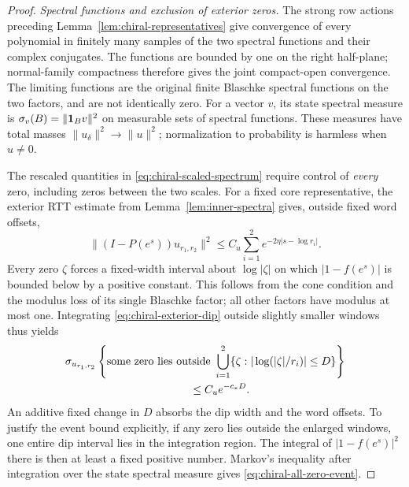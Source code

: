 \begin{proof}
\emph{Spectral functions and exclusion of exterior zeros.}
The strong row actions preceding Lemma~\ref{lem:chiral-representatives}
give convergence of every polynomial in finitely many samples of the two
spectral functions and their complex conjugates. The functions are bounded
by one on the right half-plane; normal-family compactness therefore gives
the joint compact-open convergence. The limiting functions are the original
finite Blaschke spectral functions on the two factors, and are not
identically zero. For a vector $v$, its state spectral measure is
$\sigma_v(B)=\|\mathbf1_Bv\|^2$ on measurable sets of spectral functions.
These measures have total masses
$\|u_\delta\|^2\to\|u\|^2$; normalization to probability is harmless
when $u\ne0$.

The rescaled quantities in \eqref{eq:chiral-scaled-spectrum} require
control of \emph{every} zero, including zeros between the two scales.
For a fixed core representative, the exterior RTT estimate from
Lemma~\ref{lem:inner-spectra} gives, outside fixed word offsets,
\begin{equation}\label{eq:chiral-exterior-dip}
 \|(I-P(e^s))u_{r_1,r_2}\|^2
      \le C_u\sum_{i=1}^2e^{-2\eta|s-\log r_i|}.
\end{equation}
Every zero $\zeta$ forces a fixed-width interval about $\log|\zeta|$
on which $|1-f(e^s)|$ is bounded below by a positive constant. This
follows from the cone condition and the modulus loss of its single
Blaschke factor; all other factors have modulus at most one.
Integrating \eqref{eq:chiral-exterior-dip} outside slightly smaller
windows thus yields
\begin{equation}\label{eq:chiral-all-zero-event}
\begin{split}
 &\sigma_{u_{r_1,r_2}}
 \left\{\text{some zero lies outside }
     \bigcup_{i=1}^2\{\zeta:|\log(|\zeta|/r_i)|\le D\}\right\}\\
 &\hspace{40mm}\le C_u e^{-c_*D}.
\end{split}
\end{equation}
An additive fixed change in $D$ absorbs the dip width and the word offsets.
To justify the event bound explicitly, if any zero lies outside the enlarged
windows, one entire dip interval lies in the integration region. The
integral of $|1-f(e^s)|^2$ there is then at least a fixed positive number.
Markov's inequality after integration over the state spectral measure gives
\eqref{eq:chiral-all-zero-event}.


\end{proof}
